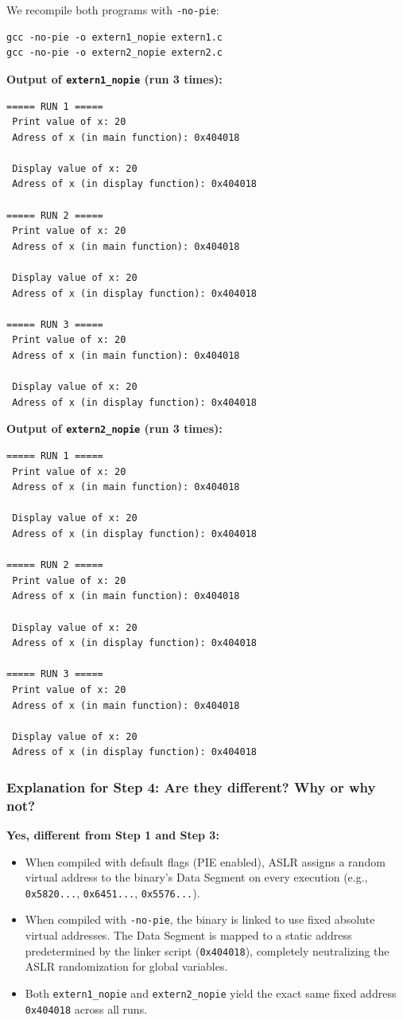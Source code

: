 \documentclass[12pt,a4paper]{article}
\begin{document}
We recompile both programs with \texttt{-no-pie}:

\begin{lstlisting}[style=bashstyle]
gcc -no-pie -o extern1_nopie extern1.c
gcc -no-pie -o extern2_nopie extern2.c
\end{lstlisting}

\textbf{Output of \texttt{extern1\_nopie} (run 3 times):}
\begin{lstlisting}[style=outstyle]
===== RUN 1 =====
 Print value of x: 20
 Adress of x (in main function): 0x404018

 Display value of x: 20
 Adress of x (in display function): 0x404018

===== RUN 2 =====
 Print value of x: 20
 Adress of x (in main function): 0x404018

 Display value of x: 20
 Adress of x (in display function): 0x404018

===== RUN 3 =====
 Print value of x: 20
 Adress of x (in main function): 0x404018

 Display value of x: 20
 Adress of x (in display function): 0x404018
\end{lstlisting}

\textbf{Output of \texttt{extern2\_nopie} (run 3 times):}
\begin{lstlisting}[style=outstyle]
===== RUN 1 =====
 Print value of x: 20
 Adress of x (in main function): 0x404018

 Display value of x: 20
 Adress of x (in display function): 0x404018

===== RUN 2 =====
 Print value of x: 20
 Adress of x (in main function): 0x404018

 Display value of x: 20
 Adress of x (in display function): 0x404018

===== RUN 3 =====
 Print value of x: 20
 Adress of x (in main function): 0x404018

 Display value of x: 20
 Adress of x (in display function): 0x404018
\end{lstlisting}

\subsubsection*{Explanation for Step 4: Are they different? Why or why not?}
\textbf{Yes, different from Step 1 and Step 3:}
\begin{itemize}
    \item When compiled with default flags (PIE enabled), ASLR assigns a random virtual address to the binary's Data Segment on every execution (e.g., \texttt{0x5820...}, \texttt{0x6451...}, \texttt{0x5576...}).
    \item When compiled with \texttt{-no-pie}, the binary is linked to use fixed absolute virtual addresses. The Data Segment is mapped to a static address predetermined by the linker script (\texttt{0x404018}), completely neutralizing the ASLR randomization for global variables.
    \item Both \texttt{extern1\_nopie} and \texttt{extern2\_nopie} yield the exact same fixed address \texttt{0x404018} across all runs.
\end{itemize}
\end{document}
